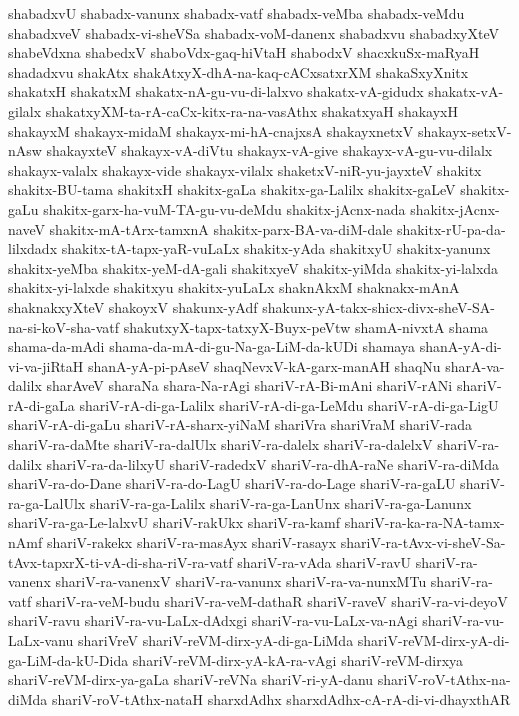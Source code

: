 {shabadxvU
shabadx-vanunx
shabadx-vatf
shabadx-veMba
shabadx-veMdu
shabadxveV
shabadx-vi-sheVSa
shabadx-voM-danenx
shabadxvu
shabadxyXteV
shabeVdxna
shabedxV
shaboVdx-gaq-hiVtaH
shabodxV
shacxkuSx-maRyaH
shadadxvu
shakAtx
shakAtxyX-dhA-na-kaq-cACxsatxrXM
shakaSxyXnitx
shakatxH
shakatxM
shakatx-nA-gu-vu-di-lalxvo
shakatx-vA-gidudx
shakatx-vA-gilalx
shakatxyXM-ta-rA-caCx-kitx-ra-na-vasAthx
shakatxyaH
shakayxH
shakayxM
shakayx-midaM
shakayx-mi-hA-cnajxsA
shakayxnetxV
shakayx-setxV-nAsw
shakayxteV
shakayx-vA-diVtu
shakayx-vA-give
shakayx-vA-gu-vu-dilalx
shakayx-valalx
shakayx-vide
shakayx-vilalx
shaketxV-niR-yu-jayxteV
shakitx
shakitx-BU-tama
shakitxH
shakitx-gaLa
shakitx-ga-Lalilx
shakitx-gaLeV
shakitx-gaLu
shakitx-garx-ha-vuM-TA-gu-vu-deMdu
shakitx-jAcnx-nada
shakitx-jAcnx-naveV
shakitx-mA-tArx-tamxnA
shakitx-parx-BA-va-diM-dale
shakitx-rU-pa-da-lilxdadx
shakitx-tA-tapx-yaR-vuLaLx
shakitx-yAda
shakitxyU
shakitx-yanunx
shakitx-yeMba
shakitx-yeM-dA-gali
shakitxyeV
shakitx-yiMda
shakitx-yi-lalxda
shakitx-yi-lalxde
shakitxyu
shakitx-yuLaLx
shaknAkxM
shaknakx-mAnA
shaknakxyXteV
shakoyxV
shakunx-yAdf
shakunx-yA-takx-shicx-divx-sheV-SA-na-si-koV-sha-vatf
shakutxyX-tapx-tatxyX-Buyx-peVtw
shamA-nivxtA
shama
shama-da-mAdi
shama-da-mA-di-gu-Na-ga-LiM-da-kUDi
shamaya
shanA-yA-di-vi-va-jiRtaH
shanA-yA-pi-pAseV
shaqNevxV-kA-garx-manAH
shaqNu
sharA-va-dalilx
sharAveV
sharaNa
shara-Na-rAgi
shariV-rA-Bi-mAni
shariV-rANi
shariV-rA-di-gaLa
shariV-rA-di-ga-Lalilx
shariV-rA-di-ga-LeMdu
shariV-rA-di-ga-LigU
shariV-rA-di-gaLu
shariV-rA-sharx-yiNaM
shariVra
shariVraM
shariV-rada
shariV-ra-daMte
shariV-ra-dalUlx
shariV-ra-dalelx
shariV-ra-dalelxV
shariV-ra-dalilx
shariV-ra-da-lilxyU
shariV-radedxV
shariV-ra-dhA-raNe
shariV-ra-diMda
shariV-ra-do-Dane
shariV-ra-do-LagU
shariV-ra-do-Lage
shariV-ra-gaLU
shariV-ra-ga-LalUlx
shariV-ra-ga-Lalilx
shariV-ra-ga-LanUnx
shariV-ra-ga-Lanunx
shariV-ra-ga-Le-lalxvU
shariV-rakUkx
shariV-ra-kamf
shariV-ra-ka-ra-NA-tamx-nAmf
shariV-rakekx
shariV-ra-masAyx
shariV-rasayx
shariV-ra-tAvx-vi-sheV-Sa-tAvx-tapxrX-ti-vA-di-sha-riV-ra-vatf
shariV-ra-vAda
shariV-ravU
shariV-ra-vanenx
shariV-ra-vanenxV
shariV-ra-vanunx
shariV-ra-va-nunxMTu
shariV-ra-vatf
shariV-ra-veM-budu
shariV-ra-veM-dathaR
shariV-raveV
shariV-ra-vi-deyoV
shariV-ravu
shariV-ra-vu-LaLx-dAdxgi
shariV-ra-vu-LaLx-va-nAgi
shariV-ra-vu-LaLx-vanu
shariVreV
shariV-reVM-dirx-yA-di-ga-LiMda
shariV-reVM-dirx-yA-di-ga-LiM-da-kU-Dida
shariV-reVM-dirx-yA-kA-ra-vAgi
shariV-reVM-dirxya
shariV-reVM-dirx-ya-gaLa
shariV-reVNa
shariV-ri-yA-danu
shariV-roV-tAthx-na-diMda
shariV-roV-tAthx-nataH
sharxdAdhx
sharxdAdhx-cA-rA-di-vi-dhayxthAR
}
